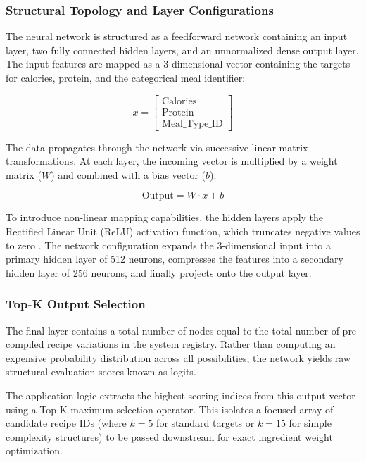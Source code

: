 \subsubsection{Structural Topology and Layer Configurations}
The neural network is structured as a feedforward network containing an input layer, two 
fully connected hidden layers, and an unnormalized dense output layer. The input features 
are mapped as a 3-dimensional vector containing the targets for calories, protein, and the 
categorical meal identifier:

\[
x = \begin{bmatrix} \text{Calories} \\ \text{Protein} \\ \text{Meal\_Type\_ID} \end{bmatrix}
\]

The data propagates through the network via successive linear matrix transformations. At each 
layer, the incoming vector is multiplied by a weight matrix ($W$) and combined with a bias 
vector ($b$):

\begin{equation}
\text{Output} = W \cdot x + b
\end{equation}

To introduce non-linear mapping capabilities, the hidden layers apply the Rectified Linear
Unit (ReLU) activation function, which truncates negative values to zero 
\cite[Ch.~10]{book:geron:handson:2019}. The network 
configuration expands the 3-dimensional input into a primary hidden layer of 512 neurons, 
compresses the features into a secondary hidden layer of 256 neurons, and finally projects 
onto the output layer.

\subsubsection{Top-K Output Selection}
The final layer contains a total number of nodes equal to the total number of pre-compiled 
recipe variations in the system registry. Rather than computing an expensive probability 
distribution across all possibilities, the network yields raw structural evaluation scores 
known as logits. 

The application logic extracts the highest-scoring indices from this output vector using a 
Top-K maximum selection operator. This isolates a focused array of candidate recipe IDs 
(where $k=5$ for standard targets or $k=15$ for simple complexity structures) to be passed 
downstream for exact ingredient weight optimization.

